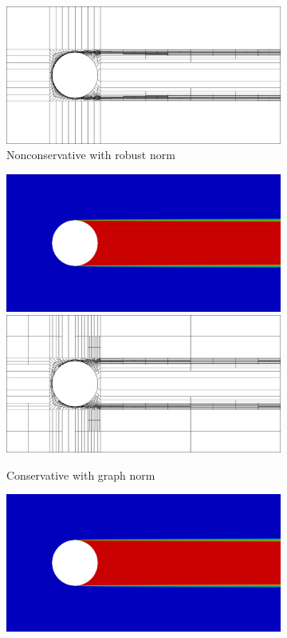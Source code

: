 \documentclass[letterpaper]{article}
\begin{document}
\begin{figure}
\begin{subfigure}[t]{0.45\textwidth}
\includegraphics[width=\textwidth]{figs/Hemker/robust8nc_mesh.png}
\caption{Nonconservative with robust norm}
\label{fig:hemkerRobust8nc}
\end{subfigure}
\begin{subfigure}[t]{0.45\textwidth}
\centering
\includegraphics[width=\textwidth]{figs/Hemker/graph8c.png}
\includegraphics[width=\textwidth]{figs/Hemker/graph8c_mesh.png}
\caption{Conservative with graph norm}
\label{fig:hemkerGraph8c}
\end{subfigure}
\begin{subfigure}[t]{0.45\textwidth}
\centering
\includegraphics[width=\textwidth]{figs/Hemker/robust8c.png}

\end{subfigure}
\end{figure}
\end{document}
